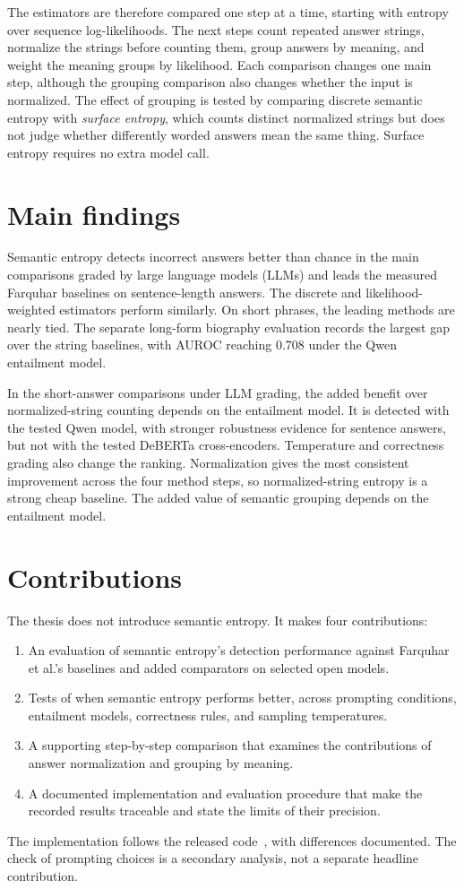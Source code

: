 The estimators are therefore compared one step at a time, starting with
entropy over sequence log-likelihoods. The next steps count repeated answer
strings, normalize the strings before counting them, group answers by meaning,
and weight the meaning groups by likelihood. Each comparison changes one main
step, although the grouping comparison also changes whether the input is normalized. The effect of grouping is tested by comparing discrete semantic entropy
with \emph{surface entropy}, which counts distinct normalized strings but does not
judge whether differently worded answers mean the same thing. Surface entropy
requires no extra model call.

\section{Main findings}
\label{sec:what-the-study-finds}

Semantic entropy detects incorrect answers better than chance in the main
comparisons graded by large language models (LLMs) and leads the measured Farquhar baselines on
sentence-length answers. The discrete and likelihood-weighted estimators
perform similarly. On short phrases, the leading methods are nearly tied.
The separate long-form biography evaluation records the largest gap over the
string baselines, with AUROC reaching 0.708 under the Qwen entailment model.

In the short-answer comparisons under LLM grading, the added benefit over
normalized-string counting depends on the entailment model. It is detected
with the tested Qwen model, with stronger robustness evidence for sentence
answers, but not with the tested DeBERTa cross-encoders. Temperature and
correctness grading also change the ranking.
Normalization gives the most consistent improvement across the four method
steps, so normalized-string entropy is a strong cheap baseline. The added
value of semantic grouping depends on the entailment model.

\section{Contributions}
\label{sec:contributions}

The thesis does not introduce semantic entropy. It makes four contributions:

\begin{enumerate}
  \item An evaluation of semantic entropy's detection performance against
    Farquhar et al.'s baselines and added comparators on selected open models.
  \item Tests of when semantic entropy performs better, across prompting
    conditions, entailment models, correctness rules, and sampling temperatures.
  \item A supporting step-by-step comparison that examines the contributions
    of answer normalization and grouping by meaning.
  \item A documented implementation and evaluation procedure that make the
    recorded results traceable and state the limits of their precision.
\end{enumerate}

The implementation follows the released
code~\cite{kossen_semantic_uncertainty_code_2024}, with differences documented.
The check of prompting choices is a secondary analysis, not a separate
headline contribution.

